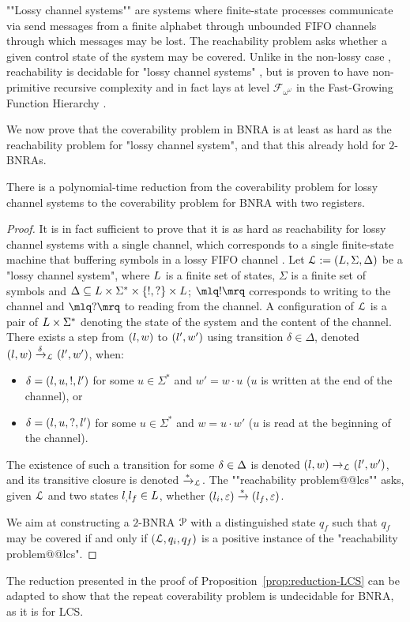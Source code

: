 ""Lossy channel systems""  are systems where finite-state processes communicate via send messages from a finite alphabet through unbounded FIFO channels through which messages may be lost. The reachability problem asks whether a given control state of the system may be covered. Unlike in the non-lossy case \cite{BZ83}, reachability is decidable for "lossy channel systems" \cite{AK95,AbdullaJ1996undec}, but is proven to have non-primitive recursive complexity \cite{Schnoebelen2002verifying} and in fact lays at level $\mathcal{F}_{\omega^{\omega}}$ in the Fast-Growing Function Hierarchy \cite{ChambartS2008ordinal}.

We now prove that the coverability problem in BNRA is at least as hard as the reachability problem for "lossy channel system", and that this already hold for $2$-BNRAs.  
\begin{proposition}
	\label{prop:reduction-LCS}
	There is a polynomial-time reduction from the coverability problem for lossy channel systems to the coverability problem for BNRA with two registers.
\end{proposition}

\ifproofs
\begin{proof}
It is in fact sufficient to prove that it is as hard as reachability for lossy channel systems with a single channel, which corresponds to a single finite-state machine that buffering symbols in a lossy FIFO channel \cite{Schnoebelen2002verifying}.
Let $\mathcal{L} := (L,\Sigma,\Delta)$ be a "lossy channel system", where $L$ is a finite set of states, $\Sigma$ is a finite set of symbols and $\Delta \subseteq L \times \Sigma^* \times \{!, ?\} \times L$; $\quotemarks{!}$ corresponds to writing to the channel and $\quotemarks{?}$ to reading from the channel. A configuration of $\mathcal{L}$ is a pair of $L \times \Sigma^*$ denoting the state of the system and the content of the channel. There exists a step from $(l,w)$ to $(l',w')$ using transition $\delta \in \Delta$, denoted $(l,w) \xrightarrow{\delta}_{\mathcal{L}} (l',w')$, when:
\begin{itemize}
\item $\delta = (l,u,!,l')$ for some $u \in \Sigma^*$ and $w' = w \cdot u$ ($u$ is written at the end of the channel), or
\item $\delta = (l,u,?,l')$ for some $u \in \Sigma^*$ and $w = u \cdot w'$ ($u$ is read at the beginning of the channel).
\end{itemize}
The existence of such a transition for some $\delta \in \Delta$ is denoted $(l,w) \xrightarrow{}_{\mathcal{L}} (l',w')$, and its transitive closure is denoted $\xrightarrow{*}_{\mathcal{L}}$. The ""reachability problem@@lcs"" asks, given $\mathcal{L}$ and two states $l_, l_f \in L$, whether $(l_i,\varepsilon) \xrightarrow{*} (l_f, \varepsilon)$. 

We aim at constructing a $2$-BNRA $\mathcal{P}$ with a distinguished state $q_f$ such that $q_f$ may be covered if and only if $(\mathcal{L}, q_i, q_f)$ is a positive instance of the "reachability problem@@lcs".

\end{proof}
\fi

\begin{remark}
	The reduction presented in the proof of Proposition~\ref{prop:reduction-LCS} can be adapted to show that the repeat coverability problem is undecidable for BNRA, as it is for LCS.
\end{remark}
